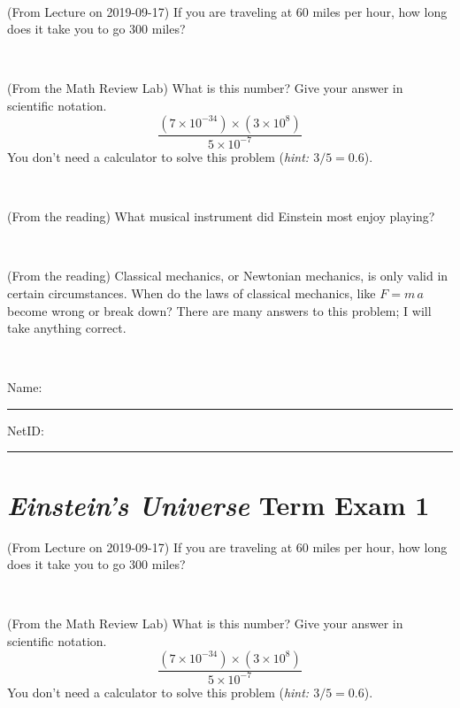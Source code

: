 \documentclass[12pt, letterpaper]{article}
\begin{document}
\vfill ~


\clearpage


\begin{problem} (From Lecture on 2019-09-17)
If you are traveling at 60 miles per hour, how long does
it take you to go 300 miles?
\end{problem}


\vfill ~

\begin{problem} (From the Math Review Lab)
What is this number? Give your answer in scientific notation.
$$
\frac{(7\times10^{-34})\times(3\times10^8)}{5\times10^{-7}}
$$
You don't need a calculator to solve this problem (\textit{hint: $3/5=0.6$}).
\end{problem}


\vfill ~

\begin{problem} (From the reading)
What musical instrument did Einstein most enjoy playing?
\end{problem}


\vfill ~

\begin{problem} (From the reading)
Classical mechanics, or Newtonian mechanics, is only valid in certain
circumstances. When do the laws of classical mechanics, like $F =
m\,a$ become wrong or break down? There are many answers to this
problem; I will take anything correct.
\end{problem}


\vfill ~


\cleardoublepage



\noindent
Name: \rule[-1ex]{0.60\textwidth}{0.1pt}
NetID: \rule[-1ex]{0.20\textwidth}{0.1pt}

\section*{\textsl{Einstein's Universe} Term Exam 1}
\setcounter{problem}{1}


\begin{problem} (From Lecture on 2019-09-17)
If you are traveling at 60 miles per hour, how long does
it take you to go 300 miles?
\end{problem}


\vfill ~

\begin{problem} (From the Math Review Lab)
What is this number? Give your answer in scientific notation.
$$
\frac{(7\times10^{-34})\times(3\times10^8)}{5\times10^{-7}}
$$
You don't need a calculator to solve this problem (\textit{hint: $3/5=0.6$}).
\end{problem}
\end{document}
